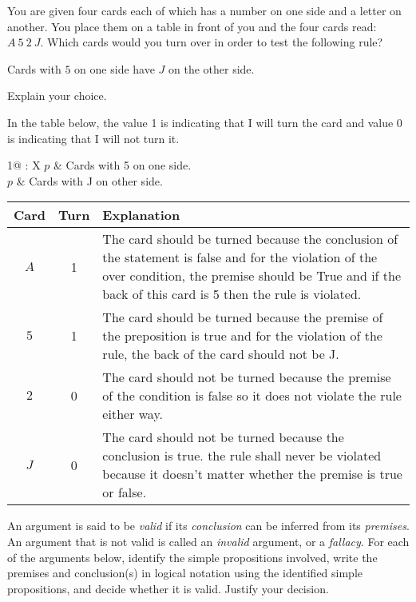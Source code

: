 \documentclass[addpoints]{exam}
\begin{document}
\begin{questions}
\question[5] You are given four cards each of which has a number on one side and a letter on another. You place them on a table in front of you and the four cards read: $A\ 5\ 2\ J$. Which cards would you turn over in order to test the following rule? 
  \begin{center}
    Cards with $5$ on one side have $J$ on the other side.
  \end{center}
  Explain your choice.
   \begin{solution}
   In the table below, the value 1 is indicating that I will turn the card and value 0 is indicating that I will not turn it.\\
   \begin{tabularx}{\textwidth}{1@{ : }X}
       $p$ & Cards with 5 on one side.\\
       $p$ & Cards with J on other side.\\
   \end{tabularx}
   \begin{center}
   \end{center}
   \begin{tabularx}{\textwidth}{c|c|X}
    Card & Turn & Explanation \\ \hline
   $A$ & 1  & The card should be turned because the conclusion of the statement is false and for the violation of the over condition, the premise should be True and if the back of this card is 5 then the rule is violated.\\
   
    $5$ & 1 & The card should be turned because the premise of the preposition is true and for the violation of the rule, the back of the card should not be J.\\
    
    $2$ & 0 &  The card should not be turned because the premise of the condition is false so it does not violate the rule either way.\\
    
    $J$ & 0 & The card should not be turned because the conclusion is true. the rule shall never be violated because it doesn't matter whether the premise is true or false.
   \end{tabularx}
  \end{solution}
  
\question An argument is said to be \textit{valid} if its \textit{conclusion} can be inferred from its \textit{premises}. An argument that is not valid is called an \textit{invalid} argument, or a \textit{fallacy}. For each of the arguments below, identify the simple propositions involved, write the premises and conclusion(s) in logical notation using the identified simple propositions, and decide whether it is valid. Justify your decision.
  \begin{parts}

\end{parts}
\end{questions}
\end{document}
